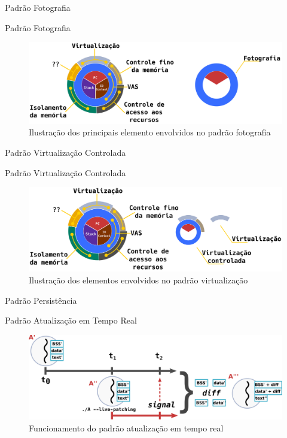 \documentclass[xcolor={usenames,svgnames,dvipsnames},brazil,english,12pt,aspectratio=149]{beamer}
\begin{document}
\begin{frame}{Padrão Fotografia}
\end{frame}

\begin{frame}{Padrão Fotografia}
	\begin{figure}[!h]
		\centering
		\includegraphics[width=.8\textwidth]{decomposition_fotografia}
		\caption{Ilustração dos principais elemento envolvidos no padrão fotografia}
		\label{fig:decomposicao_fotografia}
	\end{figure}
\end{frame}

\begin{frame}{Padrão Virtualização Controlada}
\end{frame}

\begin{frame}{Padrão Virtualização Controlada}
	\begin{figure}[!h]
		\centering
		\includegraphics[width=.8\textwidth]{decomposicao_virt_controlada}
		\caption{Ilustração dos elementos envolvidos no padrão virtualização}
		\label{fig:decomposicao_virt}
	\end{figure}
\end{frame}

\begin{frame}{Padrão Persistência}
\end{frame}

\begin{frame}{Padrão Atualização em Tempo Real}
	\begin{figure}[!h]
		\centering
		\includegraphics[width=\textwidth]{live-patching}
		\caption{Funcionamento do padrão atualização em tempo real}
		\label{fig:atr}
	\end{figure}
\end{frame}
\end{document}
